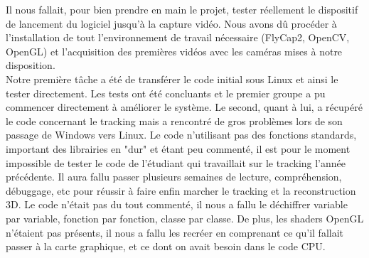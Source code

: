 Il nous fallait, pour bien prendre en main le projet, tester réellement le dispositif de lancement du logiciel jusqu'à la capture vidéo. Nous avons dû  procéder à l'installation de tout l'environnement de travail nécessaire (FlyCap2, OpenCV, OpenGL) et l’acquisition des premières vidéos avec les caméras mises à notre disposition. \\

Notre première tâche a été de transférer le code initial sous Linux et ainsi le tester directement. Les tests ont été concluants et le premier groupe a pu commencer directement à améliorer le système. Le second, quant à lui, a récupéré le code concernant le tracking mais a rencontré de gros problèmes lors de son passage de Windows vers Linux.
Le code n'utilisant pas des fonctions standards, important des librairies en "dur" et étant peu commenté, il est pour le moment impossible de tester le code de l'étudiant qui travaillait sur le tracking l'année précédente. Il aura fallu passer plusieurs semaines de lecture, compréhension, débuggage, etc pour réussir à faire enfin marcher le tracking et la reconstruction 3D.  Le code n'était pas du tout commenté, il nous a fallu le déchiffrer variable par variable, fonction par fonction, classe par classe. De plus, les shaders OpenGL n'étaient pas présents, il nous a fallu les recréer en comprenant ce qu'il fallait passer à la carte graphique, et ce dont on avait besoin dans le code CPU.